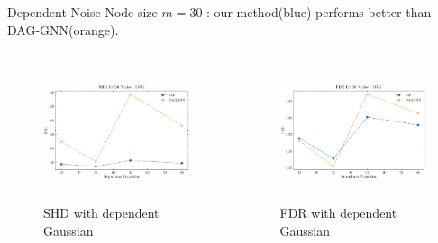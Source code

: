 \documentclass{beamer}
\begin{document}
\begin{frame}[allowframebreaks]{Dependent Noise}
    Node size $m=30$ : our method(blue) performs better than DAG-GNN(orange).
    \begin{columns}
        \begin{column}{0.5\textwidth}
            \begin{figure}
                \centering
                \includegraphics[height=4cm]{fig/SHD_dependence_30_DAG_threshold0.3.pdf}
                \caption{SHD with dependent Gaussian}
                \label{fig:dep_gaussian_shd_30}
            \end{figure}
        \end{column}
        \begin{column}{0.5\textwidth}
            \begin{figure}
                \centering
                \includegraphics[height=4cm]{fig/FDR_dependence_30_DAG_threshold0.3.pdf}
                \caption{FDR with dependent Gaussian}
                \label{fig:dep_gaussian_fdr_30}
            \end{figure}
        \end{column}
    \end{columns}
    \framebreak


\end{frame}
\end{document}

